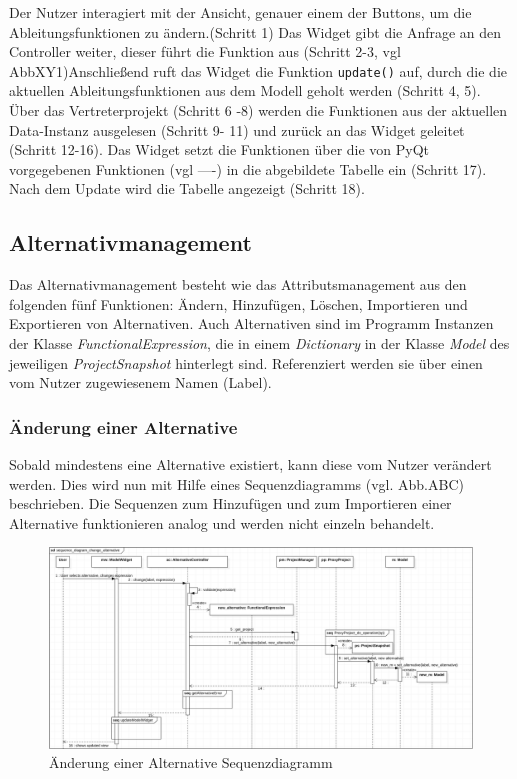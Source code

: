 \documentclass{article}
\begin{document}
Der Nutzer interagiert mit der Ansicht, genauer einem der Buttons, um die Ableitungsfunktionen zu ändern.(Schritt 1) Das Widget gibt die Anfrage an den Controller weiter, dieser führt die Funktion aus (Schritt 2-3, vgl AbbXY1)Anschließend ruft das Widget die Funktion \texttt{update()} auf, durch die die aktuellen Ableitungsfunktionen aus dem Modell geholt werden (Schritt 4, 5). Über das Vertreterprojekt (Schritt 6 -8) werden die Funktionen aus der aktuellen Data-Instanz ausgelesen (Schritt 9- 11) und zurück an das Widget geleitet (Schritt 12-16). Das Widget setzt die Funktionen über die von PyQt vorgegebenen Funktionen (vgl ----) in die abgebildete Tabelle ein (Schritt 17). Nach dem Update wird die Tabelle angezeigt (Schritt 18).


\newpage
\subsection{Alternativmanagement}
Das Alternativmanagement besteht wie das Attributsmanagement aus den folgenden fünf Funktionen: Ändern, Hinzufügen, Löschen, Importieren und Exportieren von Alternativen. Auch Alternativen sind im Programm Instanzen der Klasse \textit{FunctionalExpression}, die in einem \textit{Dictionary} in der Klasse \textit{Model} des jeweiligen \textit{ProjectSnapshot} hinterlegt sind. Referenziert werden sie über einen vom Nutzer zugewiesenem Namen (Label).
\subsubsection{Änderung einer Alternative}
Sobald mindestens eine Alternative existiert, kann diese vom Nutzer verändert werden. Dies wird nun mit Hilfe eines Sequenzdiagramms (vgl. Abb.ABC) beschrieben. Die Sequenzen zum Hinzufügen und zum Importieren einer Alternative funktionieren analog und werden nicht einzeln behandelt.
\begin{figure}[H]%
    \centering
    \includegraphics[width=12cm]{entwurf/Entwurf_dokument/img/Kevin/ChangeAlternative.png}
    \caption{Änderung einer Alternative Sequenzdiagramm}
    \label{fig:sq:ChangeAlternative}
\end{figure}
\end{document}
